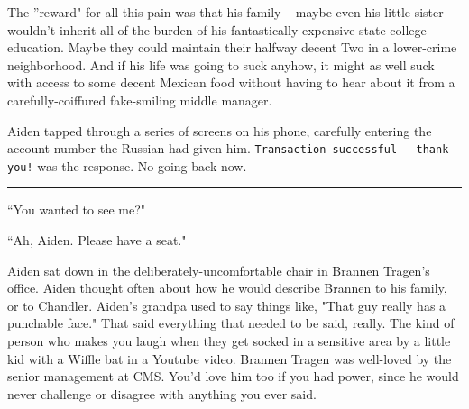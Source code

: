 \documentclass[11pt]{book}
\begin{document}
	The ''reward" for all this pain was that his family -- maybe even his little sister -- wouldn't inherit all of the burden of his fantastically-expensive state-college education. Maybe they could maintain their halfway decent Two in a lower-crime neighborhood. And if his life was going to suck anyhow, it might as well suck with access to some decent Mexican food without having to hear about it from a carefully-coiffured fake-smiling middle manager.
	
	Aiden tapped through a series of screens on his phone, carefully entering the account number the Russian had given him. \texttt{Transaction successful - thank you!} was the response. No going back now.
	
	\vspace{0.5cm}
	\hrule
	\vspace{0.5cm}
	
	``You wanted to see me?"
	
	``Ah, Aiden. Please have a seat."
	
	Aiden sat down in the deliberately-uncomfortable chair in Brannen Tragen's office. Aiden thought often about how he would describe Brannen to his family, or to Chandler. Aiden's grandpa used to say things like, "That guy really has a punchable face." That said everything that needed to be said, really. The kind of person who makes you laugh when they get socked in a sensitive area by a little kid with a Wiffle bat in a Youtube video. Brannen Tragen was well-loved by the senior management at CMS. You'd love him too if you had power, since he would never challenge or disagree with anything you ever said.
	
\end{document}
